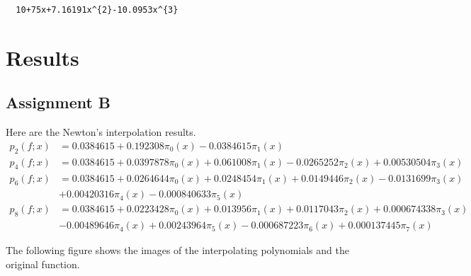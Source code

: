 \documentclass[11pt,en]{elegantpaper}
\begin{document}
\begin{lstlisting}
  10+75x+7.16191x^{2}-10.0953x^{3}
\end{lstlisting}

\section{Results}

\subsection{Assignment B}

Here are the Newton's interpolation results.
\begin{align*}
  p_2(f;x) &= 0.0384615+0.192308\pi_{0}(x)-0.0384615\pi_{1}(x)\\
  p_4(f;x) &= 0.0384615+0.0397878\pi_{0}(x)+0.061008\pi_{1}(x)-0.0265252\pi_{2}(x)+0.00530504\pi_{3}(x)\\
  p_6(f;x) &= 0.0384615+0.0264644\pi_{0}(x)+0.0248454\pi_{1}(x)+0.0149446\pi_{2}(x)-0.0131699\pi_{3}(x)\\
           &  +0.00420316\pi_{4}(x)-0.000840633\pi_{5}(x)\\
  p_8(f;x) &= 0.0384615+0.0223428\pi_{0}(x)+0.013956\pi_{1}(x)+0.0117043\pi_{2}(x)+0.000674338\pi_{3}(x)\\
           &  -0.00489646\pi_{4}(x)+0.00243964\pi_{5}(x)-0.000687223\pi_{6}(x)+0.000137445\pi_{7}(x)
\end{align*}

The following figure shows the images of the interpolating polynomials and the original function.

\end{document}
